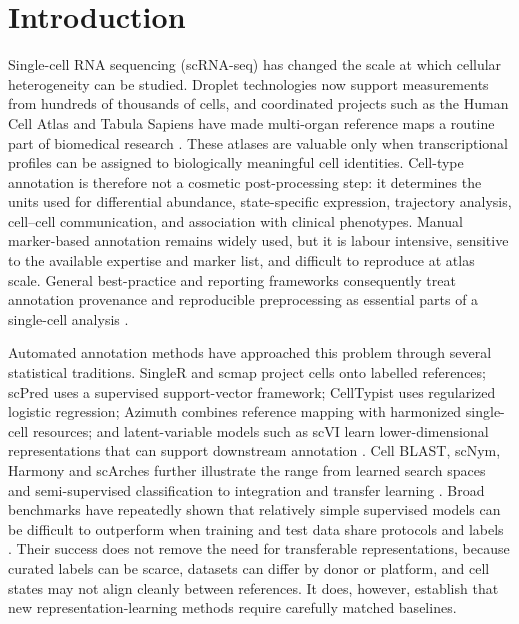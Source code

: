 \section{Introduction}

Single-cell RNA sequencing (scRNA-seq) has changed the scale at which cellular heterogeneity can be studied. Droplet technologies now support measurements from hundreds of thousands of cells, and coordinated projects such as the Human Cell Atlas and Tabula Sapiens have made multi-organ reference maps a routine part of biomedical research \citep{Macosko2015,Zheng2017,Regev2017,TabulaSapiens2022,Tanay2017}. These atlases are valuable only when transcriptional profiles can be assigned to biologically meaningful cell identities. Cell-type annotation is therefore not a cosmetic post-processing step: it determines the units used for differential abundance, state-specific expression, trajectory analysis, cell--cell communication, and association with clinical phenotypes. Manual marker-based annotation remains widely used, but it is labour intensive, sensitive to the available expertise and marker list, and difficult to reproduce at atlas scale. General best-practice and reporting frameworks consequently treat annotation provenance and reproducible preprocessing as essential parts of a single-cell analysis \citep{LueckenTheis2019,Lahnemann2020,Fullgrabe2020}.

Automated annotation methods have approached this problem through several statistical traditions. SingleR and scmap project cells onto labelled references; scPred uses a supervised support-vector framework; CellTypist uses regularized logistic regression; Azimuth combines reference mapping with harmonized single-cell resources; and latent-variable models such as scVI learn lower-dimensional representations that can support downstream annotation \citep{Aran2019,Kiselev2018,AlquicirayHernandez2019,DominguezConde2022,Hao2021,Lopez2018}. Cell BLAST, scNym, Harmony and scArches further illustrate the range from learned search spaces and semi-supervised classification to integration and transfer learning \citep{CellBlast2020,ScNym2021,Korsunsky2019,Lotfollahi2022}. Broad benchmarks have repeatedly shown that relatively simple supervised models can be difficult to outperform when training and test data share protocols and labels \citep{Abdelaal2019,Pasquini2021}. Their success does not remove the need for transferable representations, because curated labels can be scarce, datasets can differ by donor or platform, and cell states may not align cleanly between references. It does, however, establish that new representation-learning methods require carefully matched baselines.

